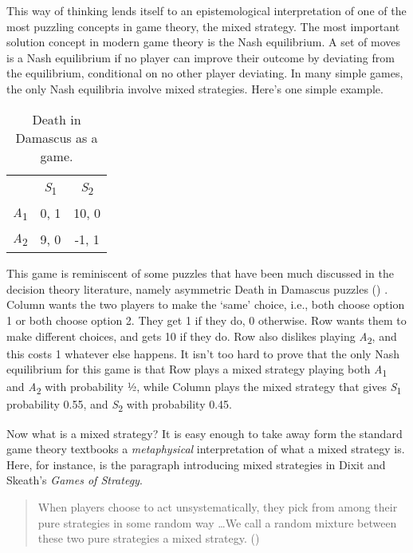 \documentclass[
  12pt,
  letterpaper,
]{scrbook}
\begin{document}
This way of thinking lends itself to an epistemological interpretation
of one of the most puzzling concepts in game theory, the mixed strategy.
The most important solution concept in modern game theory is the Nash
equilibrium. A set of moves is a Nash equilibrium if no player can
improve their outcome by deviating from the equilibrium, conditional on
no other player deviating. In many simple games, the only Nash
equilibria involve mixed strategies. Here's one simple example.

\begin{longtable}[]{@{}lcc@{}}
\caption{Death in Damascus as a
game.}\label{tbl-death-damascus}\tabularnewline
\toprule\noalign{}
\endfirsthead
\endhead
\bottomrule\noalign{}
\endlastfoot
& \emph{S}\textsubscript{1} & \emph{S}\textsubscript{2} \\
\emph{A}\textsubscript{1} & 0, 1 & 10, 0 \\
\emph{A}\textsubscript{2} & 9, 0 & -1, 1 \\
\end{longtable}

This game is reminiscent of some puzzles that have been much discussed
in the decision theory literature, namely asymmetric Death in Damascus
puzzles () . Column wants the
two players to make the `same' choice, i.e., both choose option 1 or
both choose option 2. They get 1 if they do, 0 otherwise. Row wants them
to make different choices, and gets 10 if they do. Row also dislikes
playing \emph{A}\textsubscript{2}, and this costs 1 whatever else
happens. It isn't too hard to prove that the only Nash equilibrium for
this game is that Row plays a mixed strategy playing both
\emph{A}\textsubscript{1} and \emph{A}\textsubscript{2} with probability
½, while Column plays the mixed strategy that gives
\emph{S}\textsubscript{1} probability 0.55, and
\emph{S}\textsubscript{2} with probability 0.45.

Now what is a mixed strategy? It is easy enough to take away form the
standard game theory textbooks a \emph{metaphysical} interpretation of
what a mixed strategy is. Here, for instance, is the paragraph
introducing mixed strategies in Dixit and Skeath's \emph{Games of
Strategy}.

\begin{quote}
When players choose to act unsystematically, they pick from among their
pure strategies in some random way \ldots We call a random mixture
between these two pure strategies a mixed strategy.
()
\end{quote}
\end{document}
